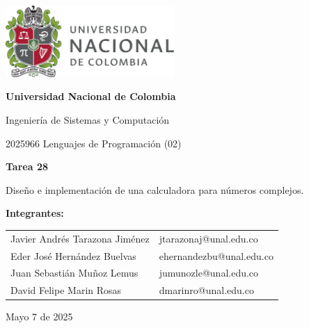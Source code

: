 \documentclass{article}
\begin{document}
\begin{titlepage}
    \centering
    \includegraphics[width=0.48\textwidth]{logo_universidad.png}
    \par\vspace{2cm}

    {\Large \textbf{Universidad Nacional de Colombia} \par}
    \vspace{0.5cm}
    {\large Ingeniería de Sistemas y Computación \par}
    {\large 2025966 Lenguajes de Programación (02)\par}
    \vspace{3cm}

    {\large \textbf{Tarea 28} \par}
    {\large Diseño e implementación de una calculadora para números complejos.\par}
    \vspace{3cm}

    {\large \textbf{Integrantes:} \par}
    \vspace{0.5cm}
    \begin{tabular}{ll}
    Javier Andrés Tarazona Jiménez & jtarazonaj@unal.edu.co \\
    Eder  José Hernández Buelvas   & ehernandezbu@unal.edu.co \\
    Juan Sebastián Muñoz Lemus     & jumunozle@unal.edu.co   \\
    David Felipe Marin Rosas       & dmarinro@unal.edu.co   \\
    \end{tabular}
    \par\vspace{3cm}

    {\large Mayo 7 de 2025 \par}
\end{titlepage}

\tableofcontents %

\newpage %
\end{document}
